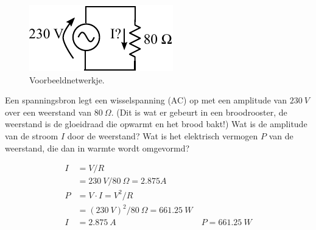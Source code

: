 \documentclass{exam}
\begin{document}
\begin{questions}
		\question 
			\begin{figure}[h!]
				\centering
				\includegraphics{vbweerstand.pdf}
				\caption{Voorbeeldnetwerkje.}
				\label{fig:vbweerstand}
			\end{figure}
			Een spanningsbron legt een wisselspanning (AC) op met een amplitude van $230~V$ over een weerstand van $80~\Omega$. (Dit is wat er gebeurt in een broodrooster, de weerstand is de gloeidraad die opwarmt en het brood bakt!) Wat is de amplitude van de  stroom $I$ door de weerstand? Wat is het elektrisch vermogen $P$ van de weerstand, die dan in warmte wordt omgevormd?			
			\begin{solutionordottedlines}[1in]
				\begin{align*}
				    I &= V/R \\ &= 230~V/80~\Omega = 2.875 A \\
				    P &= V \cdot I = V^2/R \\ &= (230~V)^2/80~\Omega = 661.25~W \\
				    I&= 2.875~A \hspace{10em}P=  661.25~W 
				\end{align*}

			\end{solutionordottedlines}


\end{questions}
\end{document}
